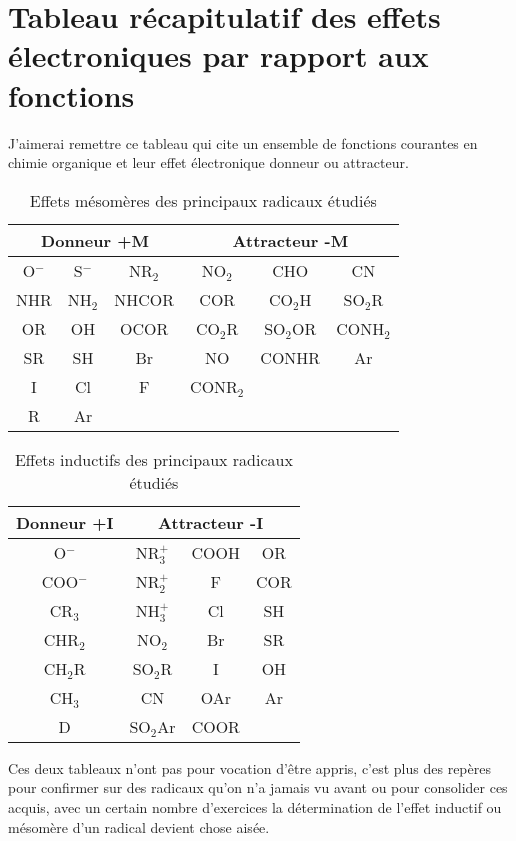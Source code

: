 \documentclass[a4paper, oneside]{book}
\begin{document}
\section{Tableau récapitulatif des effets électroniques par rapport aux fonctions}
J'aimerai remettre ce tableau qui cite un ensemble de fonctions courantes en chimie organique et leur effet électronique donneur ou attracteur.
\begin{table}[!h]
    \centering
    \begin{tabular}{|c c c|c c c|}
        \hline
        \multicolumn{3}{|c|}{Donneur +M} & \multicolumn{3}{c|}{Attracteur -M} \\
        \hline
        O$^-$ & S$^-$ & NR$_2$ & NO$_2$ & CHO & CN \\
        NHR & NH$_2$ & NHCOR & COR & CO$_2$H & SO$_2$R \\
        OR & OH & OCOR & CO$_2$R & SO$_2$OR & CONH$_2$\\
        SR & SH & Br & NO & CONHR & Ar\\
        I & Cl & F & CONR$_2$ & & \\
        R & Ar & & & & \\
        \hline
    \end{tabular}
    \caption{Effets mésomères des principaux radicaux étudiés}
    \label{tab:my_label}
\end{table}
\begin{table}[!h]
    \centering
    \begin{tabular}{|c|c c c|}
        \hline
        Donneur +I & \multicolumn{3}{|c|}{Attracteur -I} \\
        \hline
        O$^-$ & NR$_3^+$ & COOH & OR \\
        COO$^-$ & NR$_2^+$ & F & COR \\
        CR$_3$ & NH$_3^+$ & Cl & SH \\
        CHR$_2$ & NO$_2$ & Br & SR \\
        CH$_2$R & SO$_2$R & I & OH \\
        CH$_3$ & CN & OAr & Ar \\
        D & SO$_2$Ar & COOR &  \\
        \hline
    \end{tabular}
    \caption{Effets inductifs des principaux radicaux étudiés}
    \label{tab:my_label}
\end{table}
\newpage
Ces deux tableaux n'ont pas pour vocation d'être appris, c'est plus des repères pour confirmer sur des radicaux qu'on n'a jamais vu avant ou pour consolider ces acquis, avec un certain nombre d'exercices la détermination de l'effet inductif ou mésomère d'un radical devient chose aisée.
\end{document}

